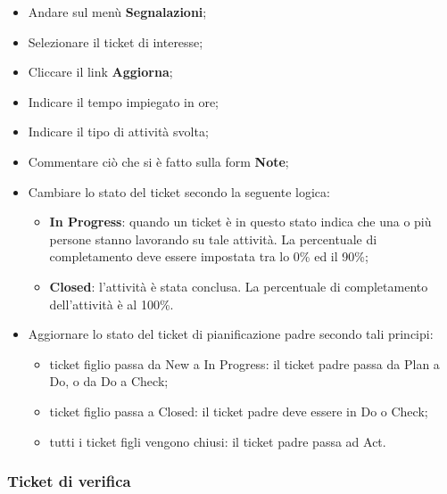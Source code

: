 \begin{itemize}
\item Andare sul menù \textbf{Segnalazioni}; 
\item Selezionare il ticket di interesse; 
\item Cliccare il link \textbf{Aggiorna}; 
\item Indicare il tempo impiegato in ore; 
\item Indicare il tipo di attività svolta; 
\item Commentare ciò che si è fatto sulla form \textbf{Note}; 
\item Cambiare lo stato del ticket secondo la seguente logica: 
		\begin{itemize}
		\item \textbf{In Progress}: quando un ticket è in questo stato indica che una o più persone 
		stanno lavorando su tale attività. La percentuale di completamento deve 
		essere impostata tra lo 0\% ed il 90\%; 
		\item \textbf{Closed}: l’attività è stata conclusa. La percentuale di completamento dell’attività è al 100\%. 
		 
		\end{itemize} 
\item Aggiornare lo stato del ticket di pianificazione padre secondo tali principi: 
		\begin{itemize}
		\item ticket figlio passa da New a In Progress: il ticket padre passa da Plan a Do, 
		o da Do a Check; 
		\item ticket figlio passa a Closed: il ticket padre deve essere in Do o Check; 
		\item tutti i ticket figli vengono chiusi: il ticket padre passa ad Act.
		\end{itemize}

\end{itemize}



\subsubsection{Ticket di verifica}

